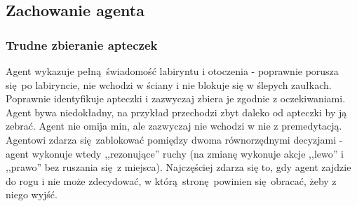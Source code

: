 \documentclass[polish,master,a4paper,oneside]{ppfcmthesis}
\begin{document}
\begin{figure}[H]
\end{figure}

\begin{figure}[H]
\end{figure}

\begin{figure}[H]
\end{figure}

\subsection{Zachowanie agenta}
\subsubsection{Trudne zbieranie apteczek}
Agent wykazuje pełną świadomość labiryntu i otoczenia - poprawnie porusza się po labiryncie, nie wchodzi w ściany i nie blokuje się w ślepych zaułkach. Poprawnie identyfikuje apteczki i zazwyczaj zbiera je zgodnie z oczekiwaniami. Agent bywa niedokładny, na przykład przechodzi zbyt daleko od apteczki by ją zebrać. Agent nie omija min, ale zazwyczaj nie wchodzi w nie z premedytacją. Agentowi zdarza się zablokować pomiędzy dwoma równorzędnymi decyzjami - agent wykonuje wtedy ,,rezonujące'' ruchy (na zmianę wykonuje akcje ,,lewo'' i ,,prawo'' bez ruszania się z miejsca). Najczęściej zdarza się to, gdy agent zajdzie do rogu i nie może zdecydować, w którą stronę powinien się obracać, żeby z niego wyjść.
\end{document}
